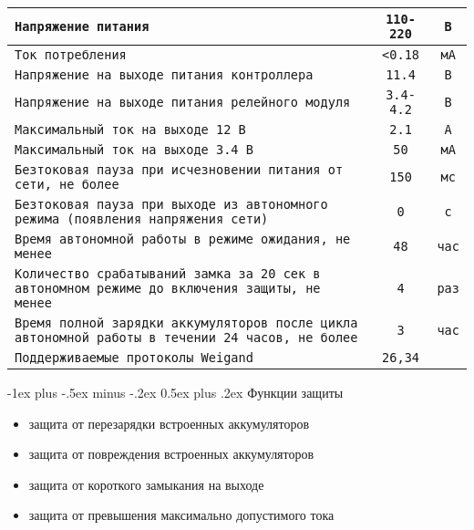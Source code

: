 \documentclass[a4paper,10pt,landscape]{article}
\makeatletter
\renewcommand{\section}{\@startsection{section}{1}{0mm}%
                                {-1ex plus -.5ex minus -.2ex}%
                                {0.5ex plus .2ex}%
                                {\normalfont\large\bfseries}}
\makeatother
\begin{document}
\begin{multicols}{3}
\noindent\begin{tabular}{p{6cm}|p{2cm}|p{2cm}}
\hline
\texttt{Напряжение питания}&\multicolumn{1}{c}{\texttt{110-220}}&\multicolumn{1}{c}{\texttt{В}}\\
\hline
\texttt{Ток потребления}&\multicolumn{1}{c}{\texttt{<0.18}}&\multicolumn{1}{c}{\texttt{мА}}\\
\hline
\texttt{Напряжение на выходе питания контроллера}&\multicolumn{1}{c}{\texttt{11.4}}&\multicolumn{1}{c}{\texttt{В}}\\
\hline
\texttt{Напряжение на выходе питания релейного модуля}&\multicolumn{1}{c}{\texttt{3.4-4.2}}&\multicolumn{1}{c}{\texttt{В}}\\
\hline
\texttt{Максимальный ток на выходе 12 В}&\multicolumn{1}{c}{\texttt{2.1}}&\multicolumn{1}{c}{\texttt{А}}\\
\hline
\texttt{Максимальный ток на выходе 3.4 В}&\multicolumn{1}{c}{\texttt{50}}&\multicolumn{1}{c}{\texttt{мА}}\\
\hline
\texttt{Безтоковая пауза при исчезновении питания от сети, не более}&\multicolumn{1}{c}{\texttt{150}}&\multicolumn{1}{c}{\texttt{мс}}\\
\hline
\texttt{Безтоковая пауза при выходе из автономного режима (появления напряжения сети)}&\multicolumn{1}{c}{\texttt{0}}&\multicolumn{1}{c}{\texttt{с}}\\
\hline
\texttt{Время автономной работы в режиме ожидания, не менее}&\multicolumn{1}{c}{\texttt{48}}&\multicolumn{1}{c}{\texttt{час}}\\
\hline
\texttt{Количество срабатываний замка за 20 сек в автономном режиме до включения защиты, не менее}&\multicolumn{1}{c}{\texttt{4}}&\multicolumn{1}{c}{\texttt{раз}}\\
\hline
\texttt{Время полной зарядки аккумуляторов после цикла автономной работы в течении 24 часов, не более}&\multicolumn{1}{c}{\texttt{3}}&\multicolumn{1}{c}{\texttt{час}}\\
\hline
\texttt{Поддерживаемые протоколы Weigand}&\multicolumn{1}{c}{\texttt{26,34}}&\multicolumn{1}{c}{\texttt{}}\\
\hline
\end{tabular}

\section{Функции защиты}

\begin{itemize} 
  \item защита от перезарядки встроенных аккумуляторов    
  \item защита от повреждения встроенных аккумуляторов
  \item защита от короткого замыкания на выходе
  \item защита от превышения максимально допустимого тока
\end{itemize}


\end{multicols}
\end{document}
